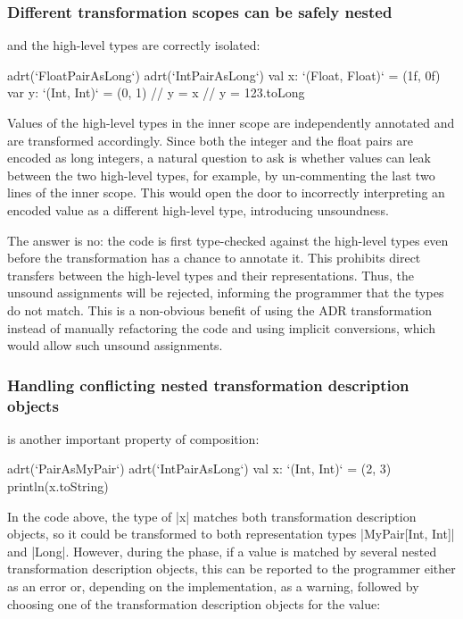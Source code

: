 \subsubsection{Different transformation scopes can be safely nested} and the high-level types are correctly isolated:

\begin{lstlisting-nobreak}
adrt(`FloatPairAsLong`) {
  adrt(`IntPairAsLong`) {
    val x: `(Float, Float)` = (1f, 0f)
    var y: `(Int, Int)` = (0, 1)
    // y = x
    // y = 123.toLong
  }
}
\end{lstlisting-nobreak}

Values of the high-level types in the inner scope are independently annotated and are transformed accordingly. Since both the integer and the float pairs are encoded as long integers, a natural question to ask is whether values can leak between the two high-level types, for example, by un-commenting the last two lines of the inner scope. This would open the door to incorrectly interpreting an encoded value as a different high-level type, introducing unsoundness.

The answer is no: the code is first type-checked against the high-level types even before the \inject{} transformation has a chance to annotate it. This prohibits direct transfers between the high-level types and their representations. Thus, the unsound assignments will be rejected, informing the programmer that the types do not match. This is a non-obvious benefit of using the ADR transformation instead of manually refactoring the code and using implicit conversions, which would allow such unsound assignments.

\subsubsection{Handling conflicting nested transformation description objects} is another important property of composition:

\begin{lstlisting-nobreak}
adrt(`PairAsMyPair`) {
  adrt(`IntPairAsLong`) {
    val x: `(Int, Int)` = (2, 3)
  }
  println(x.toString)
}
\end{lstlisting-nobreak}

In the code above, the type of |x| matches both transformation description objects, so it could be transformed to both representation types |MyPair[Int, Int]| and |Long|. However, during the \inject{} phase, if a value is matched by several nested transformation description objects, this can be reported to the programmer either as an error or, depending on the implementation, as a warning, followed by choosing one of the transformation description objects for the value:

